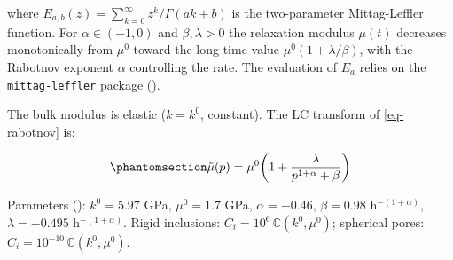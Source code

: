 \documentclass[
  a4paper,
  numbers=noendperiod,
  DIV=12]{scrreprt}
\begin{document}
where \(E_{a,b}(z)=\sum_{k=0}^\infty z^k/\Gamma(ak+b)\) is the
two-parameter Mittag-Leffler function. For \(\alpha\in(-1,0)\) and
\(\beta,\lambda>0\) the relaxation modulus \(\mu(t)\) decreases
monotonically from \(\mu^0\) toward the long-time value
\(\mu^0(1+\lambda/\beta)\), with the Rabotnov exponent \(\alpha\)
controlling the rate. The evaluation of \(E_a\) relies on the
\href{https://github.com/khinsen/mittag-leffler}{\texttt{mittag-leffler}}
package ().

The bulk modulus is elastic (\(k=k^0\), constant). The LC transform of
\ref{eq-rabotnov} is:

\begin{equation}\protect\phantomsection\label{eq-rabotnov-lc}{
\tilde{\mu}(p) = \mu^0\!\left(1 + \frac{\lambda}{p^{1+\alpha} + \beta}\right)
}\end{equation}

Parameters ():
\(k^0=5.97\) GPa, \(\mu^0=1.7\) GPa, \(\alpha=-0.46\), \(\beta=0.98\)
h\(^{-(1+\alpha)}\), \(\lambda=-0.495\) h\(^{-(1+\alpha)}\). Rigid
inclusions: \(C_i=10^6\,\mathbb{C}(k^0,\mu^0)\); spherical pores:
\(C_i=10^{-10}\,\mathbb{C}(k^0,\mu^0)\).
\end{document}
